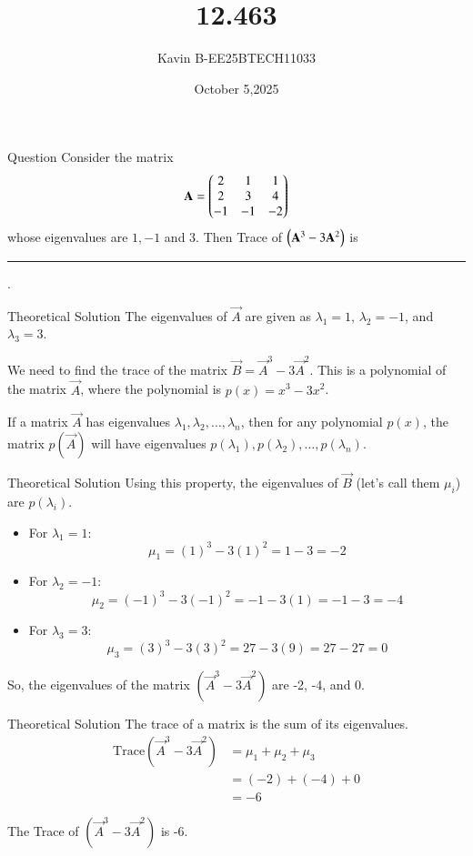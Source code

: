 \documentclass{beamer}
\begin{document}
\title 
{12.463}
\date{October 5,2025}


\author 
{Kavin B-EE25BTECH11033}






\frame{\titlepage}
\begin{frame}{Question}
Consider the matrix
\begin{align*}
\mathbf{A} = \begin{pmatrix}2 & 1 & 1 \\ 2 & 3 & 4 \\ -1 & -1 & -2\end{pmatrix}
\end{align*}
whose eigenvalues are $1, -1$ and $3$. Then Trace of $\left(\mathbf{A}^3 - 3\mathbf{A}^2\right)$ is \rule{1cm}{0.01pt}.
\\    
\bigskip

\end{frame}



\begin{frame}{Theoretical Solution}
The eigenvalues of $\vec{A}$ are given as $\lambda_1 = 1$, $\lambda_2 = -1$, and $\lambda_3 = 3$.\\
\bigskip

We need to find the trace of the matrix $\vec{B} = \vec{A}^3 - 3\vec{A}^2$. This is a polynomial of the matrix $\vec{A}$, where the polynomial is $p(x) = x^3 - 3x^2$.\\
\bigskip

If a matrix $\vec{A}$ has eigenvalues $\lambda_1, \lambda_2, \dots, \lambda_n$, then for any polynomial $p(x)$, the matrix $p(\vec{A})$ will have eigenvalues $p(\lambda_1), p(\lambda_2), \dots, p(\lambda_n)$.\\

\end{frame}

\begin{frame}{Theoretical Solution}
Using this property, the eigenvalues of $\vec{B}$ (let's call them $\mu_i$) are $p(\lambda_i)$.

\begin{itemize}
    \item For $\lambda_1 = 1$:
    $$ \mu_1 = (1)^3 - 3(1)^2 = 1 - 3 = -2 $$
    
    \item For $\lambda_2 = -1$:
    $$ \mu_2 = (-1)^3 - 3(-1)^2 = -1 - 3(1) = -1 - 3 = -4 $$
    
    \item For $\lambda_3 = 3$:
    $$ \mu_3 = (3)^3 - 3(3)^2 = 27 - 3(9) = 27 - 27 = 0 $$
\end{itemize}
So, the eigenvalues of the matrix $(\vec{A}^3 - 3\vec{A}^2)$ are -2, -4, and 0.\\
\bigskip
\end{frame}

\begin{frame}{Theoretical Solution}
The trace of a matrix is the sum of its eigenvalues.
\begin{align*}
\text{Trace}(\vec{A}^3 - 3\vec{A}^2) &= \mu_1 + \mu_2 + \mu_3 \\
&= (-2) + (-4) + 0 \\
&= -6
\end{align*}

The Trace of $(\vec{A}^3 - 3\vec{A}^2)$ is -6.

\end{frame}
\end{document}
